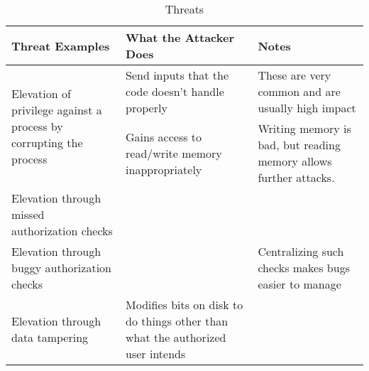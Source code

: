\begin{table}[h!]
  \centering
  \begin{tabular}{p{5.7cm}p{5.7cm}p{5.7cm}}
    \toprule
    Threat Examples & What the Attacker Does & Notes \\
    \midrule
    \multirow{2}{5.7cm}{Elevation of privilege against a process by corrupting the process} & Send inputs that the code doesn't handle properly & These are very common and are usually high impact \\ \cline{2-3}
                    & Gains access to read/write memory inappropriately & Writing memory is bad, but reading memory allows further attacks. \\
    \midrule
    \multirow{1}{5.7cm}{Elevation through missed authorization checks} & & \\
    \midrule
    \multirow{1}{5.7cm}{Elevation through buggy authorization checks} & & Centralizing such checks makes bugs easier to manage \\
    \midrule
    \multirow{1}{5.7cm}{Elevation through data tampering} & Modifies bits on disk to do things other than what the authorized user intends & \\
    \bottomrule
  \end{tabular}
  \caption{ Threats}
  \label{tab:Elevation_of_Privilege_Threats}
\end{table}

